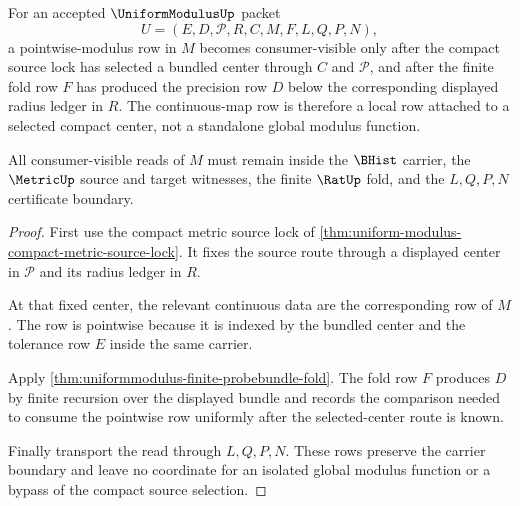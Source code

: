 \begin{theorem}
\label{thm:uniform-modulus-continuous-map-modulus-lock}
For an accepted $\UniformModulusUp$ packet
$$
U=(E,D,\mathcal{P},R,C,M,F,L,Q,P,N),
$$
a pointwise-modulus row in $M$ becomes consumer-visible only after the compact source lock has selected a bundled center through $C$ and $\mathcal{P}$, and after the finite fold row $F$ has produced the precision row $D$ below the corresponding displayed radius ledger in $R$. The continuous-map row is therefore a local row attached to a selected compact center, not a standalone global modulus function.

All consumer-visible reads of $M$ must remain inside the $\BHist$ carrier, the $\MetricUp$ source and target witnesses, the finite $\RatUp$ fold, and the $L,Q,P,N$ certificate boundary.
\end{theorem}
\begin{proof}
First use the compact metric source lock of \autoref{thm:uniform-modulus-compact-metric-source-lock}. It fixes the source route through a displayed center in $\mathcal{P}$ and its radius ledger in $R$.

At that fixed center, the relevant continuous data are the corresponding row of $M$. The row is pointwise because it is indexed by the bundled center and the tolerance row $E$ inside the same carrier.

Apply \autoref{thm:uniformmodulus-finite-probebundle-fold}. The fold row $F$ produces $D$ by finite recursion over the displayed bundle and records the comparison needed to consume the pointwise row uniformly after the selected-center route is known.

Finally transport the read through $L,Q,P,N$. These rows preserve the carrier boundary and leave no coordinate for an isolated global modulus function or a bypass of the compact source selection.
\end{proof}

